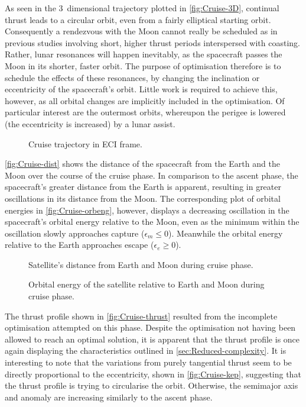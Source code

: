 As seen in the 3~dimensional trajectory plotted in \autoref{fig:Cruise-3D}, continual thrust leads to a circular orbit, even from a fairly elliptical starting orbit. Consequently a rendezvous with the Moon cannot really be scheduled as in previous studies involving short, higher thrust periods interspersed with coasting. Rather, lunar resonances will happen inevitably, as the spacecraft passes the Moon in its shorter, faster orbit. The purpose of optimisation therefore is to schedule the effects of these resonances, by changing the inclination or eccentricity of the spacecraft's orbit. Little work is required to achieve this, however, as all orbital changes are implicitly included in the optimisation. Of particular interest are the outermost orbits, whereupon the perigee is lowered (the eccentricity is increased) by a lunar assist.

\begin{figure}
\centering
\def\svgwidth{\figurewidth}

\caption{Cruise trajectory in ECI frame.}
\label{fig:Cruise-3D}
\end{figure}

\autoref{fig:Cruise-dist} shows the distance of the spacecraft from the Earth and the Moon over the course of the cruise phase. In comparison to the ascent phase, the spacecraft's greater distance from the Earth is apparent, resulting in greater oscillations in its distance from the Moon. The corresponding plot of orbital energies in \autoref{fig:Cruise-orbeng}, however, displays a decreasing oscillation in the spacecraft's orbital energy relative to the Moon, even as the minimum within the oscillation slowly approaches capture ($\epsilon_m\le0$). Meanwhile the orbital energy relative to the Earth approaches escape ($\epsilon_e\ge0$). 

\begin{figure}
\centering
\def\svgwidth{\figurewidth}

\caption{Satellite's distance from Earth and Moon during cruise phase.}
\label{fig:Cruise-dist}
\end{figure}

\begin{figure}
\centering
\def\svgwidth{\figurewidth}

\caption{Orbital energy of the satellite relative to Earth and Moon during cruise phase.}
\label{fig:Cruise-orbeng}
\end{figure}

The thrust profile shown in \autoref{fig:Cruise-thrust} resulted from the incomplete optimisation attempted on this phase. Despite the optimisation not having been allowed to reach an optimal solution, it is apparent that the thrust profile is once again displaying the characteristics outlined in \autoref{sec:Reduced-complexity}. It is interesting to note that the variations from purely tangential thrust seem to be directly proportional to the eccentricity, shown in \autoref{fig:Cruise-kep}, suggesting that the thrust profile is trying to circularise the orbit. Otherwise, the semimajor axis and anomaly are increasing similarly to the ascent phase.

